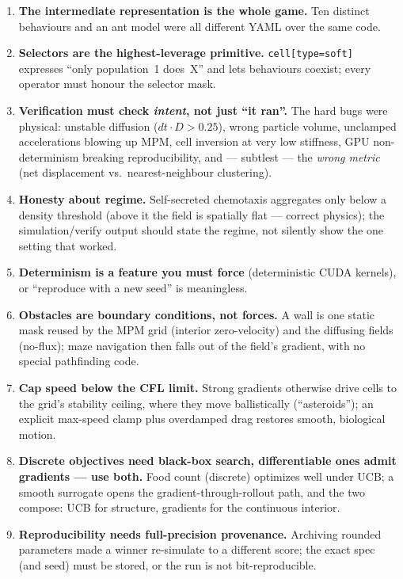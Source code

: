 \documentclass[11pt]{article}
\newcommand{\code}[1]{\texttt{#1}}
\begin{document}
\begin{enumerate}\itemsep2pt
\item \textbf{The intermediate representation is the whole game.} Ten distinct
behaviours and an ant model were all different YAML over the same code.
\item \textbf{Selectors are the highest-leverage primitive.} \code{cell[type=soft]}
expresses ``only population~1 does~X'' and lets behaviours coexist; every operator
must honour the selector mask.
\item \textbf{Verification must check \emph{intent}, not just ``it ran''.} The hard
bugs were physical: unstable diffusion ($dt\!\cdot\!D>0.25$), wrong particle volume,
unclamped accelerations blowing up MPM, cell inversion at very low stiffness, GPU
non-determinism breaking reproducibility, and --- subtlest --- the \emph{wrong
metric} (net displacement vs.\ nearest-neighbour clustering).
\item \textbf{Honesty about regime.} Self-secreted chemotaxis aggregates only below
a density threshold (above it the field is spatially flat --- correct physics); the
simulation/verify output should state the regime, not silently show the one setting
that worked.
\item \textbf{Determinism is a feature you must force} (deterministic CUDA kernels),
or ``reproduce with a new seed'' is meaningless.
\item \textbf{Obstacles are boundary conditions, not forces.} A wall is one static
mask reused by the MPM grid (interior zero-velocity) and the diffusing fields
(no-flux); maze navigation then falls out of the field's gradient, with no special
pathfinding code.
\item \textbf{Cap speed below the CFL limit.} Strong gradients otherwise drive cells
to the grid's stability ceiling, where they move ballistically (``asteroids''); an
explicit max-speed clamp plus overdamped drag restores smooth, biological motion.
\item \textbf{Discrete objectives need black-box search, differentiable ones admit
gradients --- use both.} Food count (discrete) optimizes well under UCB; a smooth
surrogate opens the gradient-through-rollout path, and the two compose: UCB for
structure, gradients for the continuous interior.
\item \textbf{Reproducibility needs full-precision provenance.} Archiving rounded
parameters made a winner re-simulate to a different score; the exact spec (and seed)
must be stored, or the run is not bit-reproducible.
\end{enumerate}
\end{document}

